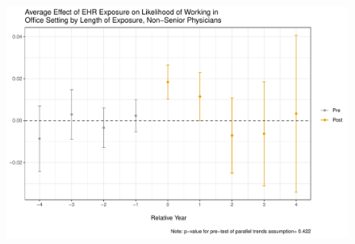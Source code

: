 \documentclass[11pt]{article}
\begin{document}
\begin{figure}[ht]
{\begin{minipage}[b]{0.47\linewidth}
            \includegraphics[width=\textwidth]{Objects/CS_office_indyoung_allEHR.pdf}
        \end{minipage}}
        \label{fig:officefirst}
\end{figure}
\end{document}
